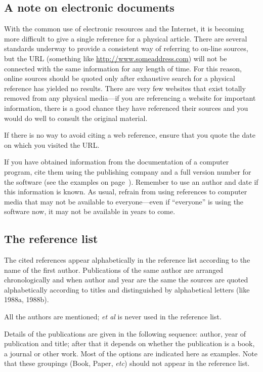 \documentclass[a5paper, 10pt]{article}
\begin{document}
\subsection{A note on electronic documents}
With the common use of electronic resources and the Internet, it is
becoming more difficult to give a single reference for a physical
article.  There are several standards underway to provide a consistent
way of referring to on-line sources, but the URL (something like
\url{http://www.someaddress.com}) will not be connected with the same
information for any length of time.  For this reason, online sources
should be quoted only after exhaustive search for a physical reference
has yielded no results.  There are very few websites that exist
totally removed from any physical media---if you are referencing a
website for important information, there is a good chance they have
referenced their sources and you would do well to consult the original
material.

If there is no way to avoid citing a web reference, ensure that you
quote the date on which you visited the URL.

If you have obtained information from the documentation of a computer
program, cite them using the publishing company and a full version
number for the software (see the examples on
page~\pageref{page:ref_compsoftware}).  Remember to use an author and date
if this information is known.  As usual, refrain from using references
to computer media that may not be available to everyone---even if
``everyone'' is using the software now, it may not be available in
years to come.

\subsection{The reference list}
\label{sec:referencelist}

The cited references appear alphabetically in the reference list
according to the name of the first author.  Publications of the same
author are arranged chronologically and when author and year are the
same the sources are quoted alphabetically according to titles and
distinguished by alphabetical letters (like 1988a, 1988b).

All the authors are mentioned;  \emph{et al}  is never used in the
reference list.

Details of the publications are given in the following sequence:
author, year of publication and title; after that it depends on
whether the publication is a book, a journal or other work.  Most of
the options are indicated here as examples.  
Note that these groupings (Book, Paper, \emph{etc}) should not appear 
in the reference list.
\end{document}
